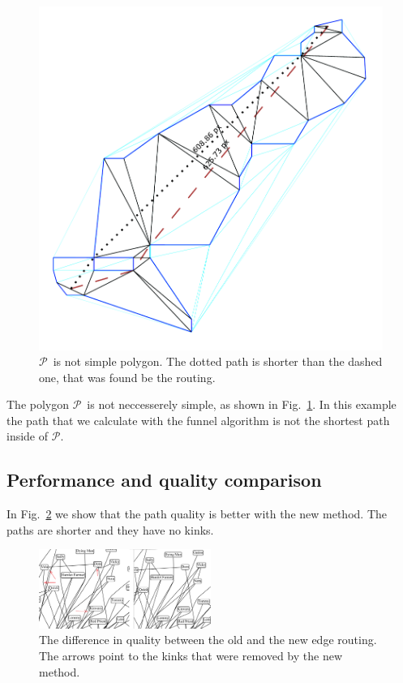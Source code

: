 \documentclass{gd-llncs}
\newcommand{\plg}{$\mathcal{P}$}
\begin{document}
{\begin{figure}[]
  \centering
  \includegraphics*[]{sleeve_diagonals_not_optimal.pdf}
  \caption{\plg~is not simple polygon. The dotted path is shorter than the dashed one, that was found be the routing.}
  \label{fig:non_optimal_path}
\end{figure}


The polygon \plg~is not neccesserely simple, as shown in Fig.~\ref{fig:non_optimal_path}.
In this example the path that we calculate with the funnel algorithm is not the shortest path inside of \plg.
\subsection*{Performance and quality comparison}
In Fig.~\ref{fig:improved_routing} we show that the path quality is better with the new method. The paths are shorter and they have no kinks.
\begin{figure}[]
  \centering
  \includegraphics*[width=0.5\textwidth]{comparison.png}
  \caption{The difference in quality between the old and the new edge routing. The arrows point to the kinks that were removed by the new method.}
  \label{fig:improved_routing}
\end{figure}

}
\end{document}
